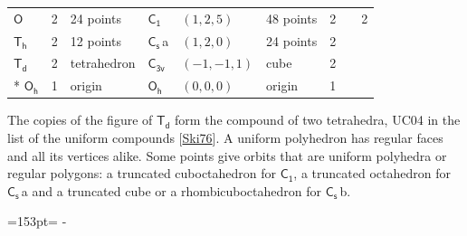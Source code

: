 \documentclass[10pt,a4paper]{article}
\newcommand{\needspace}[1]{\par\penalty-100\begingroup\dimen0=#1\relax\dimen2=\pagegoal
  \advance\dimen2-\pagetotal\ifdim\dimen0>\dimen2\relax\ifdim\dimen2>0pt\vfil\break\fi\fi
  \endgroup}
\numberwithin{equation}{section}
\newcommand{\grp}[1]{\mathsf{#1}}
\newcommand{\clsletter}[1]{\,{\scriptsize\color{black!55}#1}}
\newlength{\fillwidth}\newlength{\cellwidth}\newlength{\colwidth}
\begin{document}
{{\begin{longtable}{@{}lrllllr>{\RaggedRight\arraybackslash}p{\fillwidth}r@{}}
\href{O.pdf}{$\grp{O}$} & 2 & 24 points & \href{C1.pdf}{$\grp{C_{1}}$} & $(1, 2, 5)$ & 48 points & 2 &  & 2\\
\href{Th.pdf}{$\grp{T_{h}}$} & 2 & 12 points & \href{C1v.pdf}{$\grp{C_{s}}$}\clsletter{a} & $(1, 2, 0)$ & 24 points & 2 &  & \\
\href{Td.pdf}{$\grp{T_{d}}$} & 2 & tetrahedron & \href{C3v.pdf}{$\grp{C_{3v}}$} & $(-1, -1, 1)$ & cube & 2 &  & \\*
\href{Oh.pdf}{$\grp{O_{h}}$} & 1 & origin & \href{Oh.pdf}{$\grp{O_{h}}$} & $(0, 0, 0)$ & origin & 1 &  & \\
\bottomrule\end{longtable}}}
The copies of the figure of \href{Td.pdf}{$\grp{T_{d}}$} form the compound of two tetrahedra, UC04 in the list of the uniform compounds [\href{../../../REFERENCES.pdf\#ref.Ski76}{Ski76}]. A uniform polyhedron has regular faces and all its vertices alike. Some points give orbits that are uniform polyhedra or regular polygons: a truncated cuboctahedron for \href{C1.pdf}{$\grp{C_{1}}$}, a truncated octahedron for \href{C1v.pdf}{$\grp{C_{s}}$}\clsletter{a} and a truncated cube or a rhombicuboctahedron for \href{C1v.pdf}{$\grp{C_{s}}$}\clsletter{b}.
\needspace{153pt}
\end{document}
